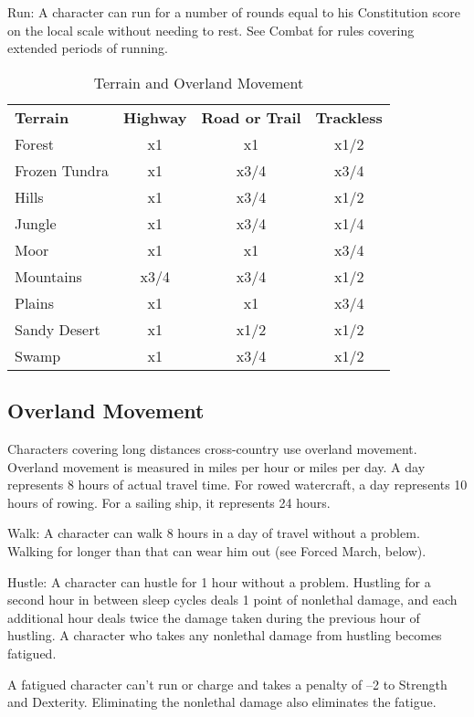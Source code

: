 Run: A character can run for a number of rounds equal to his Constitution score on the local scale without needing to rest. See Combat for rules covering extended periods of running.

\begin{table}[htb]
\sffamily
{}
\caption{Terrain and Overland Movement}
\centering
\begin{tabular}{l c c c}
\textbf{Terrain} & \textbf{Highway} & \textbf{Road or Trail} & \textbf{Trackless}\\
Forest & x1 & x1 & x1/2\\
Frozen Tundra & x1 & x3/4 & x3/4\\
Hills & x1 & x3/4 & x1/2\\
Jungle & x1 & x3/4 & x1/4\\
Moor & x1 & x1 & x3/4\\
Mountains & x3/4 & x3/4 & x1/2\\
Plains & x1 & x1 & x3/4\\
Sandy Desert & x1 & x1/2 & x1/2\\
Swamp & x1 & x3/4 & x1/2\\
\end{tabular}
\end{table}

\subsection{Overland Movement}

				
Characters covering long distances cross-country use overland movement. Overland movement is measured in miles per hour or miles per day. A day represents 8 hours of actual travel time. For rowed watercraft, a day represents 10 hours of rowing. For a sailing ship, it represents 24 hours.
				
Walk: A character can walk 8 hours in a day of travel without a problem. Walking for longer than that can wear him out (see Forced March, below).
				
Hustle: A character can hustle for 1 hour without a problem. Hustling for a second hour in between sleep cycles deals 1 point of nonlethal damage, and each additional hour deals twice the damage taken during the previous hour of hustling. A character who takes any nonlethal damage from hustling becomes fatigued.
				
A fatigued character can't run or charge and takes a penalty of --2 to Strength and Dexterity. Eliminating the nonlethal damage also eliminates the fatigue.
				

